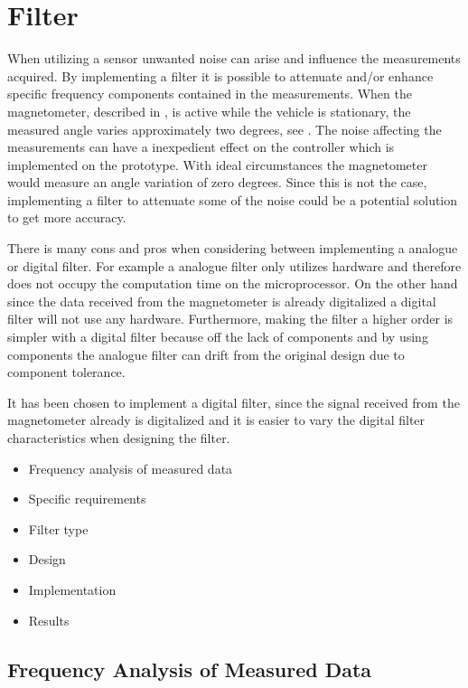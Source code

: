 \chapter{Filter}

When utilizing a sensor unwanted noise can arise and influence the measurements acquired. By implementing a filter it is possible to attenuate and/or enhance specific frequency components contained in the measurements. When the magnetometer, described in , is active while the vehicle is stationary, the measured angle varies approximately two degrees, see . The noise affecting the measurements can have a inexpedient effect on the controller which is implemented on the prototype. With ideal circumstances the magnetometer would measure an angle variation of zero degrees. Since this is not the case, implementing a filter to attenuate some of the noise could be a potential solution to get more accuracy.

There is many cons and pros when considering between implementing a analogue or digital filter. For example a analogue filter only utilizes hardware and therefore does not occupy the computation time on the microprocessor. On the other hand since the data received from the magnetometer is already digitalized a digital filter will not use any hardware. Furthermore, making the filter a higher order is simpler with a digital filter because off the lack of components and by using components the analogue filter can drift from the original design due to component tolerance. 

It has been chosen to implement a digital filter, since the signal received from the magnetometer already is digitalized and it is easier to vary the digital filter characteristics when designing the filter.

\begin{itemize}
\item Frequency analysis of measured data
\item Specific requirements
\item Filter type
\item Design
\item Implementation
\item Results
\end{itemize}

\section{Frequency Analysis of Measured Data}


